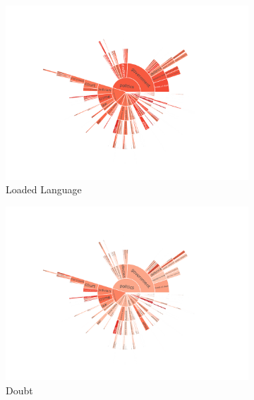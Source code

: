 \begin{figure}[!htbp]
    \centering
	\begin{subfigure}{0.45\textwidth}
		\includegraphics[trim={2.2cm 2cm 2.2cm 2cm},clip,width=\linewidth]{figures/baly_iptc_weighted_prop_tech_Loaded_Language.pdf}
		\caption{Loaded Language}
            \label{fig:baly_iptc_weighted_prop_tech_Loaded_Language}
	\end{subfigure}
	\begin{subfigure}{0.45\textwidth}
		\includegraphics[trim={2.2cm 2cm 2.2cm 2cm},clip,width=\linewidth]{figures/baly_iptc_weighted_prop_tech_Doubt.pdf}
		\caption{Doubt}
            \label{fig:baly_iptc_weighted_prop_tech_Doubt}
	\end{subfigure}
	\begin{subfigure}{0.45\textwidth}

\end{subfigure}
\end{figure}
